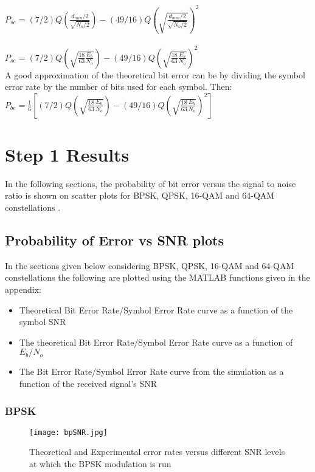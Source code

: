 \documentclass[]{article}
\begin{document}
$P_{se} = (7/2)Q\left(\frac{d_{min}/2}{\sqrt{N_o/2}}\right) -(49/16)Q\left(\sqrt{\frac{d_{min}/2}{\sqrt{N_o/2}}}\right)^2$ \\ \\

$P_{se} = (7/2)Q\left(\sqrt{\frac{18}{63}\frac{E_b}{N_o}}\right)-(49/16)Q\left(\sqrt{\frac{18}{63}\frac{E_b}{N_o}}\right)^2$ \\

A good approximation of the theoretical bit error can be by dividing the symbol error rate by the number of bits used for each symbol. Then:\\

$P_{be} = \frac{1}{6}\left[(7/2)Q\left(\sqrt{\frac{18}{63}\frac{E_b}{N_o}}\right)-(49/16)Q\left(\sqrt{\frac{18}{63}\frac{E_b}{N_o}}\right)^2\right]$ \\

\section{Step 1 Results}
In the following sections, the probability of bit error versus the signal to noise ratio is shown on scatter plots for BPSK, QPSK, 16-QAM and 64-QAM constellations .

\subsection{Probability of Error vs SNR plots}
In the sections given below considering BPSK, QPSK, 16-QAM and 64-QAM constellations the following  are plotted using the MATLAB functions given in the appendix:
\begin{itemize}
\item Theoretical Bit Error Rate/Symbol Error Rate curve as a function of the symbol SNR
\item The theoretical Bit Error Rate/Symbol Error Rate curve as a function of $E_b/N_o$
\item The Bit Error Rate/Symbol Error Rate curve from the simulation as a function of the received signal's SNR
\end{itemize}

\subsubsection{BPSK}
\begin{figure}[H]
\centering
\hspace*{-2cm}\texttt{[image: bpSNR.jpg]}
\caption{Theoretical and Experimental error rates versus different SNR levels at which the BPSK modulation is run }
\end{figure}
\end{document}
